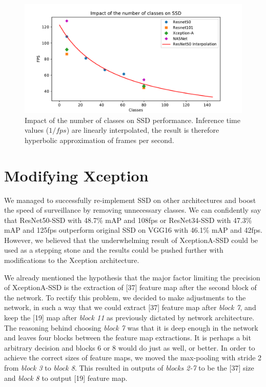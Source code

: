 \begin{figure}
    \centering
    \includegraphics[width=\textwidth]{img/fps_cls}
    \caption[Impact of the number of classes on SSD performance]{Impact of the number of classes on SSD performance. Inference time values ($1/fps$) are linearly interpolated, the result is therefore hyperbolic approximation of frames per second.}
    \label{fig:fpscls}
\end{figure}


\section{Modifying Xception}
\label{sec:fixxception}
We managed to successfully re-implement SSD on other architectures and boost the speed of surveillance by removing unnecessary classes. We can confidently say that ResNet50-SSD with 48.7\% mAP and 108fps or ResNet34-SSD with 47.3\% mAP and 125fps outperform original SSD on VGG16 with 46.1\% mAP and 42fps. However, we believed that the underwhelming result of XceptionA-SSD could be used as a stepping stone and the results could be pushed further with modifications to the Xception architecture. 

We already mentioned the hypothesis that the major factor limiting the precision of XceptionA-SSD is the extraction of [37] feature map after the second block of the network. To rectify this problem, we decided to make adjustments to the network, in such a way that we could extract [37] feature map after \textit{block 7}, and keep the [19] map after \textit{block 11} as previously dictated by network architecture. The reasoning behind choosing \textit{block 7} was that it is deep enough in the network and leaves four blocks between the feature map extractions. It is perhaps a bit arbitrary decision and blocks 6 or 8 would do just as well, or better.  In order to achieve the correct sizes of feature maps, we moved the max-pooling with stride 2 from \textit{block 3} to \textit{block 8}. This resulted in outputs of \textit{blocks 2-7} to be the [37] size and \textit{block 8} to output [19] feature map. 

